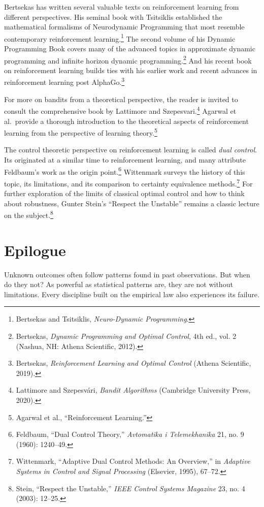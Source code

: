 \documentclass{tufte-book}
\begin{document}
Bertsekas has written several valuable texts on reinforcement learning
from different perspectives. His seminal book with Tsitsiklis
established the mathematical formalisms of Neurodynamic Programming that
most resemble contemporary reinforcement learning.\footnote{Bertsekas
  and Tsitsiklis, \emph{Neuro-Dynamic Programming}.} The second volume
of his Dynamic Programming Book covers many of the advanced topics in
approximate dynamic programming and infinite horizon dynamic
programming.\footnote{Bertsekas, \emph{Dynamic Programming and Optimal
  Control}, 4th ed., vol. 2 (Nashua, NH: Athena Scientific, 2012).} And
his recent book on reinforcement learning builds ties with his earlier
work and recent advances in reinforcement learning post
AlphaGo.\footnote{Bertsekas, \emph{Reinforcement Learning and Optimal
  Control} (Athena Scientific, 2019).}

For more on bandits from a theoretical perspective, the reader is
invited to consult the comprehensive book by Lattimore and
Szepesvari.\footnote{Lattimore and Szepesvári, \emph{Bandit Algorithms}
  (Cambridge University Press, 2020).} Agarwal et al.~provide a thorough
introduction to the theoretical aspects of reinforcement learning from
the perspective of learning theory.\footnote{Agarwal et al.,
  {``Reinforcement Learning.''}}

The control theoretic perspective on reinforcement learning is called
\emph{dual control}. Its originated at a similar time to reinforcement
learning, and many attribute Feldbaum's work as the origin
point.\footnote{Feldbaum, {``Dual Control Theory,''} \emph{Avtomatika i
  Telemekhanika} 21, no. 9 (1960): 1240--49.} Wittenmark surveys the
history of this topic, its limitations, and its comparison to certainty
equivalence methods.\footnote{Wittenmark, {``Adaptive Dual Control
  Methods: An Overview,''} in \emph{Adaptive Systems in Control and
  Signal Processing} (Elsevier, 1995), 67--72.} For further exploration
of the limits of classical optimal control and how to think about
robustness, Gunter Stein's ``Respect the Unstable'' remains a classic
lecture on the subject.\footnote{Stein, {``Respect the Unstable,''}
  \emph{IEEE Control Systems Magazine} 23, no. 4 (2003): 12--25.}

\chapter{Epilogue}

Unknown outcomes often follow patterns found in past observations. But
when do they not? As powerful as statistical patterns are, they are not
without limitations. Every discipline built on the empirical law also
experiences its failure.
\end{document}
